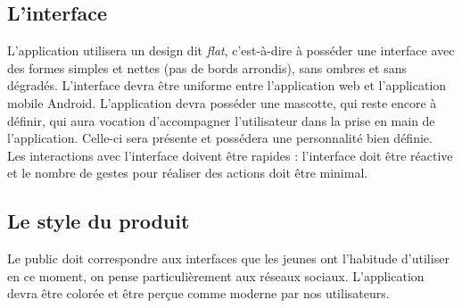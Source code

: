 \subsection{L'interface}
L'application utilisera un design dit \textit{flat}, c'est-à-dire à posséder une interface avec des formes simples et nettes (pas de bords arrondis), sans ombres et sans dégradés. L'interface devra être uniforme entre l'application web et l'application mobile Android. L'application devra posséder une mascotte, qui reste encore à définir, qui aura vocation d'accompagner l'utilisateur dans la prise en main de l'application. Celle-ci sera présente et possédera une personnalité bien définie.\\

Les interactions avec l'interface doivent être rapides : l'interface doit être réactive et le nombre de gestes pour réaliser des actions doit être minimal.

\subsection{Le style du produit}
Le public doit correspondre aux interfaces que les jeunes ont l'habitude d'utiliser en ce moment, on pense particulièrement aux réseaux sociaux. L'application devra être colorée et être perçue comme moderne par nos utilisateurs.